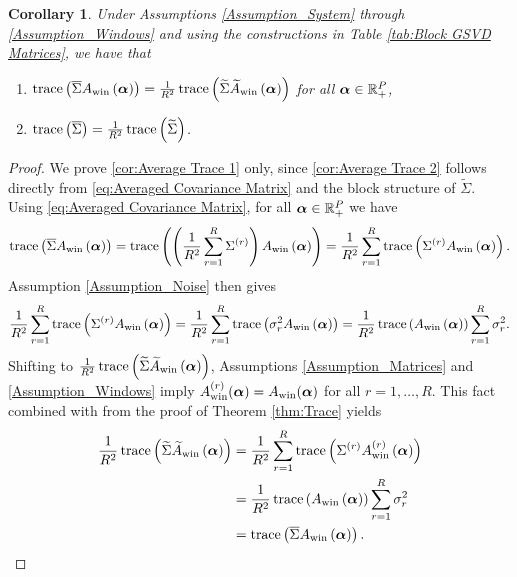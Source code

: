 \documentclass[12pt]{article}
\newtheorem{corollary}{Corollary}[theorem]
\begin{document}
\begin{corollary}
\label{cor:Averaged Trace}
Under Assumptions \ref{Assumption_System} through \ref{Assumption_Windows} and using the constructions in Table \ref{tab:Block GSVD Matrices}, we have that
\begin{enumerate}[label={(\roman*)}]
\item $\operatorname{trace}\left(\overline{\Sigma}A_{\text{win}}\left(\bm{\alpha}\right)\right) = \frac{1}{R^2}\operatorname{trace}\left(\widetilde{\Sigma}\widetilde{A}_{\text{win}}\left(\bm{\alpha}\right)\right)$ for all $\bm{\alpha} \in \mathbb{R}_{+}^{P}$,
\label{cor:Average Trace 1}
\item $\operatorname{trace}\left(\overline{\Sigma}\right) = \frac{1}{R^2}\operatorname{trace}\left(\widetilde{\Sigma}\right)$.
\label{cor:Average Trace 2}
\end{enumerate}
\end{corollary}
\begin{proof}
We prove \ref{cor:Average Trace 1} only, since \ref{cor:Average Trace 2} follows directly from \eqref{eq:Averaged Covariance Matrix} and the block structure of $\widetilde{\Sigma}$. Using \eqref{eq:Averaged Covariance Matrix}, for all $\bm{\alpha} \in \mathbb{R}_{+}^{P}$ we have 
\[\operatorname{trace}\left(\overline{\Sigma}A_{\text{win}}\left(\bm{\alpha}\right)\right) = \operatorname{trace}\left(\left(\frac{1}{R^2}\sum_{r=1}^{R}\Sigma^{(r)}\right)A_{\text{win}}\left(\bm{\alpha}\right)\right) = \frac{1}{R^2}\sum_{r=1}^{R}\operatorname{trace}\left(\Sigma^{(r)}A_{\text{win}}\left(\bm{\alpha}\right)\right).\]
Assumption \ref{Assumption_Noise} then gives
\[\frac{1}{R^2}\sum_{r=1}^{R}\operatorname{trace}\left(\Sigma^{(r)}A_{\text{win}}\left(\bm{\alpha}\right)\right) = \frac{1}{R^2}\sum_{r=1}^{R}\operatorname{trace}\left(\sigma_r^2A_{\text{win}}\left(\bm{\alpha}\right)\right) = \frac{1}{R^2}\operatorname{trace}\left(A_{\text{win}}\left(\bm{\alpha}\right)\right)\sum_{r=1}^{R}\sigma_r^2.\]
Shifting to $\frac{1}{R^2}\operatorname{trace}\left(\widetilde{\Sigma}\widetilde{A}_{\text{win}}\left(\bm{\alpha}\right)\right)$, Assumptions \ref{Assumption_Matrices} and \ref{Assumption_Windows} imply $A_{\text{win}}^{(r)}(\bm{\alpha}) = A_{\text{win}}(\bm{\alpha})$ for all $r = 1,\ldots,R$. This fact combined with from the proof of Theorem \ref{thm:Trace} yields
\begin{align*}
\frac{1}{R^2}\operatorname{trace}\left(\widetilde{\Sigma}\widetilde{A}_{\text{win}}\left(\bm{\alpha}\right)\right) &= \frac{1}{R^2}\sum_{r=1}^{R}\operatorname{trace}\left(\Sigma^{(r)}A_{\text{win}}^{(r)}\left(\bm{\alpha}\right)\right) \\
&= \frac{1}{R^2}\operatorname{trace}\left(A_{\text{win}}\left(\bm{\alpha}\right)\right)\sum_{r=1}^{R}\sigma_r^2 \\
&= \operatorname{trace}\left(\overline{\Sigma}A_{\text{win}}\left(\bm{\alpha}\right)\right).
\end{align*}
\end{proof}
\end{document}
